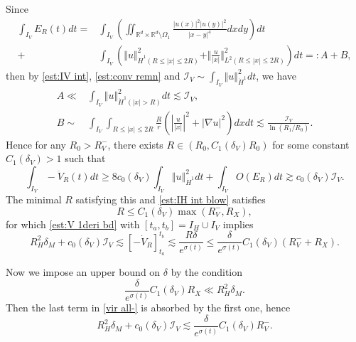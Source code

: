 \documentclass[reqno, 11pt]{amsart}
\numberwithin{equation}{section}
\newcommand{\R}{\mathbb{R}}
\theoremstyle{plain}
\theoremstyle{definition}
\numberwithin{equation}{section}
\numberwithin{theorem}{section}
\numberwithin{equation}{section}
\numberwithin{equation}{section}
\numberwithin{theorem}{section}
\begin{document}
	Since
	\begin{equation*}
	\begin{aligned}
	\int_{I_V} E_R(t)dt=&\int_{I_V}\left( \iint_{\R^d\times \R^d \setminus \varOmega_1} \frac{\big|u(x)\big|^2\big|u(y)\big|^2}{|x-y|^4}dxdy \right)dt \\+&\int_{I_V}\left( \Vert u \Vert_{\dot H^1(R\leq|x|\leq 2R)}^2+\Vert \frac{u}{|x|} \Vert_{L^2(R\leq|x|\leq 2R)}^2  \right)dt=:A+B,
	\end{aligned}
	\end{equation*}
	then by \eqref{est:IV int}, \eqref{est:conv remn} and $\mathcal{I}_V\sim \int_{I_V} \Vert u \Vert_{\dot H^1}^2 dt$, we have
	\begin{equation*}
	\begin{aligned}
	A\ll&\int_{I_V} \Vert u \Vert_{\dot H^1(|x|>R)}^2dt\lesssim \mathcal{I}_V,\\ B\sim&\int_{I_V}\int_{R\leq|x|\leq 2R} \frac{R}{r}\left( |\frac{u}{|x|}|^2+|\nabla u|^2 \right)dxdt\lesssim \frac{\mathcal{I}_V}{\ln (R_1/R_0)}.
	\end{aligned}
	\end{equation*}
	Hence for any $R_{0}>R_{V}^{-}$, there exists $R\in \left(R_0,C_1(\delta_{V})R_0 \right)$ for some constant $C_1(\delta_{V})>1$ such that
	\begin{equation*}
	\int_{I_V} -\ddot{V}_R(t)dt\geq 8 c_0(\delta_{V})\int_{I_V}\Vert u \Vert_{\dot H^1}^2 dt
	+\int_{I_V} O(E_R)dt \gtrsim c_0(\delta_{V})\mathcal{I}_V.
	\end{equation*}
	The minimal $R$ satisfying this and \eqref{est:IH int blow} satisfies
	\begin{equation*}
	R\leq C_1(\delta_{V})\max \left(R_{V}^{-},R_X\right),
	\end{equation*}
	for which \eqref{est:V 1deri bd} with $[t_a,t_b]=I_H\cup I_V$ implies 
	\begin{equation}\label{vir all-}
	R_{H}^2 \delta_{M}+c_0(\delta_{V})\mathcal{I}_V\lesssim[-\dot{V}_R]_{t_a}^{t_b}\lesssim \frac{R \delta}{e^{\sigma(t)}} \leq \frac{\delta}{e^{\sigma(t)}} C_1(\delta_{V}) \left(R_{V}^{-}+R_{X}  \right) .
	\end{equation}
	
	Now we impose an upper bound on $\delta$ by the condition
	\begin{equation}\label{con:blow 1}
	\frac{\delta}{e^{\sigma(t)}} C_1(\delta_{V})R_{X} \ll R_{H}^2 \delta_{M}.
	\end{equation}
	Then the last term in \eqref{vir all-} is absorbed by the first one, hence
	\begin{equation}\label{vir red-}
	R_{H}^2 \delta_{M}+c_0(\delta_{V})\mathcal{I}_V\lesssim \frac{\delta}{e^{\sigma(t)}} C_1(\delta_{V})R_{V}^{-}.
	\end{equation}
	
\end{document}
